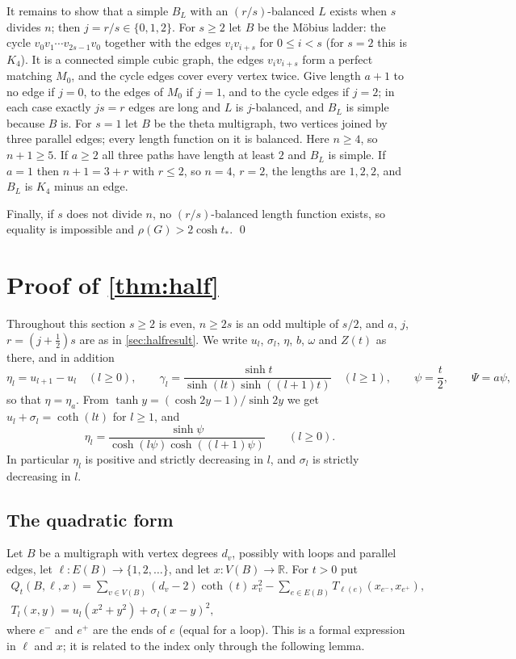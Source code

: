 \documentclass[11pt]{article}
\theoremstyle{definition}
\theoremstyle{remark}
\begin{document}
It remains to show that a simple $B_L$ with an $(r/s)$-balanced $L$ exists when $s$ divides $n$; then
$j=r/s\in\{0,1,2\}$. For $s\ge2$ let $B$ be the M\"obius ladder: the cycle $v_0v_1\cdots v_{2s-1}v_0$ together with the
edges $v_iv_{i+s}$ for $0\le i<s$ (for $s=2$ this is $K_4$). It is a connected simple cubic graph, the edges $v_iv_{i+s}$
form a perfect matching $M_0$, and the cycle edges cover every vertex twice. Give length $a+1$ to no edge if $j=0$, to the
edges of $M_0$ if $j=1$, and to the cycle edges if $j=2$; in each case exactly $js=r$ edges are long and $L$ is
$j$-balanced, and $B_L$ is simple because $B$ is. For $s=1$ let $B$ be the theta multigraph, two vertices joined by
three parallel edges; every length function on it is balanced. Here $n\ge4$, so $n+1\ge5$. If $a\ge2$ all three paths
have length at least $2$ and $B_L$ is simple. If $a=1$ then $n+1=3+r$ with $r\le2$, so $n=4$, $r=2$, the lengths are
$1,2,2$, and $B_L$ is $K_4$ minus an edge.

Finally, if $s$ does not divide $n$, no $(r/s)$-balanced length function exists, so equality is impossible and
$\rho(G)>2\cosh t_*$. \qed

\section{Proof of \texorpdfstring{\cref{thm:half}}{Theorem 6}}\label{sec:halfproof}

Throughout this section $s\ge2$ is even, $n\ge2s$ is an odd multiple of $s/2$, and $a$, $j$, $r=(j+\frac12)s$ are as
in \cref{sec:halfresult}. We write $u_l$, $\sigma_l$, $\eta$, $b$, $\omega$ and $Z(t)$ as there, and in addition
\[
\eta_l=u_{l+1}-u_l\quad(l\ge0),\qquad \gamma_l=\frac{\sinh t}{\sinh(lt)\sinh((l+1)t)}\quad(l\ge1),\qquad
\psi=\frac t2,\qquad \Psi=a\psi,
\]
so that $\eta=\eta_a$. From $\tanh y=(\cosh 2y-1)/\sinh 2y$ we get $u_l+\sigma_l=\coth(lt)$ for $l\ge1$, and
\begin{equation}\label{eq:etal}
\eta_l=\frac{\sinh\psi}{\cosh(l\psi)\cosh((l+1)\psi)}\qquad(l\ge0).
\end{equation}
In particular $\eta_l$ is positive and strictly decreasing in $l$, and $\sigma_l$ is strictly decreasing in $l$.

\subsection{The quadratic form}

Let $B$ be a multigraph with vertex degrees $d_v$, possibly with loops and parallel edges, let $\ell\colon
E(B)\to\{1,2,\dots\}$, and let $x\colon V(B)\to\mathbb R$. For $t>0$ put
\begin{equation}\label{eq:Q}
\begin{gathered}
Q_t(B,\ell,x)=\sum_{v\in V(B)}(d_v-2)\coth(t)\,x_v^2-\sum_{e\in E(B)}T_{\ell(e)}(x_{e^-},x_{e^+}),\\
T_l(x,y)=u_l(x^2+y^2)+\sigma_l(x-y)^2,
\end{gathered}
\end{equation}
where $e^-$ and $e^+$ are the ends of $e$ (equal for a loop). This is a formal expression in $\ell$ and $x$; it is
related to the index only through the following lemma.
\end{document}
